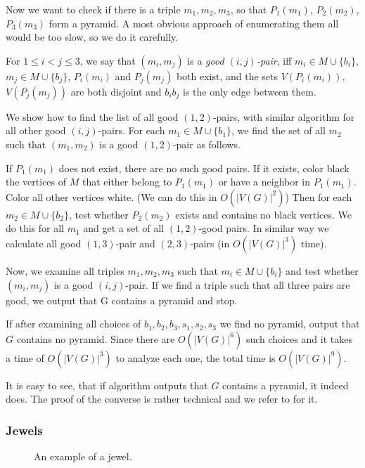 \begin{algtext2}
	Now we want to check if there is a triple $m_1, m_2, m_3$, so that $P_1(m_1)$, $P_2(m_2)$, $P_3(m_3)$ form a pyramid. A most obvious approach of enumerating them all would be too slow, so we do it carefully.

	For $1 \leq i < j \leq 3$, we say that $(m_i, m_j)$ is a \emph{good $(i, j)$-pair}, iff $m_i \in M \cup \{b_i\}$, $m_j \in M \cup \{b_j\}$, $P_i(m_i)$ and $P_j(m_j)$ both exist, and the sets $V(P_i(m_i))$,$V(P_j(m_j))$ are both disjoint and $b_ib_j$ is the only edge between them.

	We show how to find the list of all good $(1, 2)$-pairs, with similar algorithm for all other good $(i, j)$-pairs. For each $m_1 \in M \cup \{b_1\}$, we find the set of all $m_2$ such that $(m_1, m_2)$ is a good $(1,2)$-pair as follows.

	If $P_1(m_1)$ does not exist, there are no such good pairs. If it exists, color black the vertices of $M$ that either belong to $P_1(m_1)$ or have a neighbor in $P_1(m_1)$. Color all other vertices white. (We can do this in $O(|V(G)|^2)$) Then for each $m_2 \in M \cup \{b_2\}$, test whether $P_2(m_2)$ exists and contains no black vertices. We do this for all $m_1$ and get a set of all $(1,2)$-good pairs. In similar way we calculate all good $(1,3)$-pair and $(2,3)$-pairs (in $O(|V(G)|^3)$ time).

	Now, we examine all triples $m_1, m_2, m_3$ such that $m_i \in M \cup \{b_i\}$ and test whether $(m_i, m_j)$ is a good $(i, j)$-pair. If we find a triple such that all three pairs are good, we output that G contains a pyramid and stop.

	If after examining all choices of $b_1, b_2, b_3, s_1, s_2, s_3$ we find no pyramid, output that $G$ contains no pyramid. Since there are $O(|V(G)|^6)$ such choices and it takes a time of $O(|V(G)|^3)$ to analyze each one, the total time is $O(|V(G)|^9)$.
\end{algtext2}

It is easy to see, that if algorithm outputs that $G$ contains a pyramid, it indeed does. The proof of the converse is rather technical and we refer to \cite{MC05} for it.

\subsubsection{Jewels}

\begin{wrapfigure}{r}{0.35\textwidth}
	
	\caption{An example of a jewel.}
	\vspace{-1.5cm}
\end{wrapfigure}


